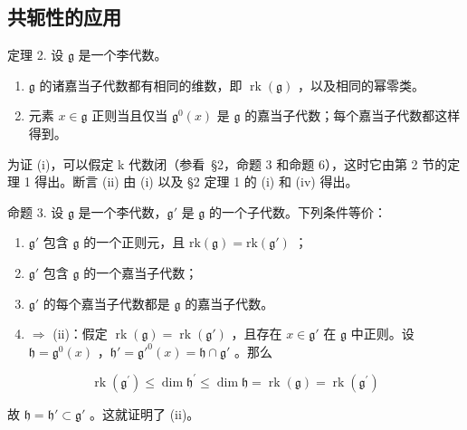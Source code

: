 \subsection{共轭性的应用}

定理 2. 设 \(\mathfrak{g}\) 是一个李代数。

\begin{enumerate}
\def\labelenumi{(\roman{enumi})}
\item
  \(\mathfrak{g}\) 的诸嘉当子代数都有相同的维数，即 \(\operatorname{rk}(\mathfrak{g})\) ，以及相同的幂零类。
\item
  元素 \(x \in \mathfrak{g}\) 正则当且仅当 \(\mathfrak{g}^0(x)\) 是 \(\mathfrak{g}\) 的嘉当子代数；每个嘉当子代数都这样得到。
\end{enumerate}

为证 (i)，可以假定 k 代数闭（参看~§2，命题 3 和命题 6），这时它由第 2 节的定理 1 得出。断言 (ii) 由 (i) 以及 §2 定理 1 的 (i) 和 (iv) 得出。

命题 3. 设 \(\mathfrak{g}\) 是一个李代数，\(\mathfrak{g}'\) 是 \(\mathfrak{g}\) 的一个子代数。下列条件等价：

\begin{enumerate}
\def\labelenumi{(\roman{enumi})}
\item
  \(\mathfrak{g}'\) 包含 \(\mathfrak{g}\) 的一个正则元，且 \(\mathrm{rk}(\mathfrak{g}) = \mathrm{rk}(\mathfrak{g}')\) ；
\item
  \(\mathfrak{g}'\) 包含 \(\mathfrak{g}\) 的一个嘉当子代数；
\item
  \(\mathfrak{g}'\) 的每个嘉当子代数都是 \(\mathfrak{g}\) 的嘉当子代数。
\item
  \(\Longrightarrow\) (ii)：假定 \(\operatorname{rk}(\mathfrak{g}) = \operatorname{rk}(\mathfrak{g}')\) ，且存在 \(x \in \mathfrak{g}'\) 在 \(\mathfrak{g}\) 中正则。设 \(\mathfrak{h} = \mathfrak{g}^0(x)\) ，\(\mathfrak{h}' = \mathfrak{g}'^0(x) = \mathfrak{h} \cap \mathfrak{g}'\) 。那么
\end{enumerate}

\[
\operatorname{rk} \left(\mathfrak {g} ^ {\prime}\right) \leq \dim \mathfrak {h} ^ {\prime} \leq \dim \mathfrak {h} = \operatorname{rk} (\mathfrak {g}) = \operatorname{rk} \left(\mathfrak {g} ^ {\prime}\right)
\]

故 \(\mathfrak{h} = \mathfrak{h}'\subset \mathfrak{g}'\) 。这就证明了 (ii)。

